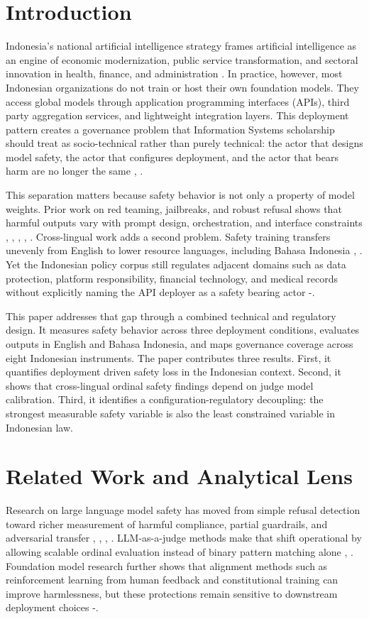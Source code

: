 \documentclass[conference]{IEEEtran}
\begin{document}
\section{Introduction}
Indonesia's national artificial intelligence strategy frames artificial intelligence as an engine of economic modernization, public service transformation, and sectoral innovation in health, finance, and administration \cite{b9}. In practice, however, most Indonesian organizations do not train or host their own foundation models. They access global models through application programming interfaces (APIs), third party aggregation services, and lightweight integration layers. This deployment pattern creates a governance problem that Information Systems scholarship should treat as socio-technical rather than purely technical: the actor that designs model safety, the actor that configures deployment, and the actor that bears harm are no longer the same \cite{b2}, \cite{b7}.

This separation matters because safety behavior is not only a property of model weights. Prior work on red teaming, jailbreaks, and robust refusal shows that harmful outputs vary with prompt design, orchestration, and interface constraints \cite{b1}, \cite{b3}, \cite{b4}, \cite{b17}, \cite{b18}. Cross-lingual work adds a second problem. Safety training transfers unevenly from English to lower resource languages, including Bahasa Indonesia \cite{b5}, \cite{b6}. Yet the Indonesian policy corpus still regulates adjacent domains such as data protection, platform responsibility, financial technology, and medical records without explicitly naming the API deployer as a safety bearing actor \cite{b10}-\cite{b16}.

This paper addresses that gap through a combined technical and regulatory design. It measures safety behavior across three deployment conditions, evaluates outputs in English and Bahasa Indonesia, and maps governance coverage across eight Indonesian instruments. The paper contributes three results. First, it quantifies deployment driven safety loss in the Indonesian context. Second, it shows that cross-lingual ordinal safety findings depend on judge model calibration. Third, it identifies a configuration-regulatory decoupling: the strongest measurable safety variable is also the least constrained variable in Indonesian law.

\section{Related Work and Analytical Lens}
Research on large language model safety has moved from simple refusal detection toward richer measurement of harmful compliance, partial guardrails, and adversarial transfer \cite{b3}, \cite{b17}, \cite{b19}, \cite{b20}. LLM-as-a-judge methods make that shift operational by allowing scalable ordinal evaluation instead of binary pattern matching alone \cite{b21}, \cite{b22}. Foundation model research further shows that alignment methods such as reinforcement learning from human feedback and constitutional training can improve harmlessness, but these protections remain sensitive to downstream deployment choices \cite{b24}-\cite{b27}.
\end{document}
